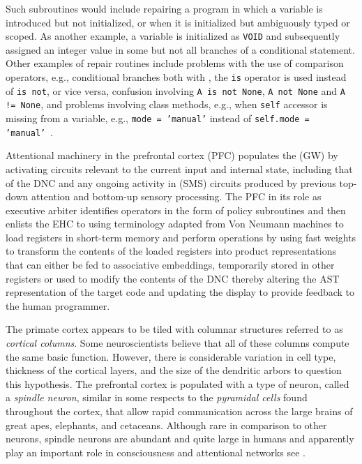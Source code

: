 Such subroutines would include repairing a program in which a variable is introduced but not initialized, or when it is initialized but ambiguously typed or scoped. As another example, a variable is initialized as {\tt{VOID}} and subsequently assigned an integer value in some but not all branches of a conditional statement. Other examples of repair routines include problems with the use of comparison operators, e.g., conditional branches both with \hmleq{}, the {\tt{is}} operator is used instead of {\tt{is not}}, or vice versa, confusion involving {\tt{A is not None}}, {\tt{A not None}} and {\tt{A != None}}, and problems involving class methods, e.g., when {\tt{self}} accessor is missing from a variable, e.g., {\tt{mode = 'manual'}} instead of {\tt{self.mode = 'manual'}}~\cite{ShinetalICLR-18b,DevlinetalICLR-18,WangetalCoRR-17}.

Attentional machinery in the prefrontal cortex (PFC) populates the (GW) by activating circuits relevant to the current input and internal state, including that of the DNC and any ongoing activity in (SMS) circuits produced by previous top-down attention and bottom-up sensory processing. The PFC in its role as executive arbiter identifies operators in the form of policy subroutines and then enlists the EHC to \emdash{} using terminology adapted from Von Neumann machines \emdash{} to load registers in short-term memory and perform operations by using fast weights to transform the contents of the loaded registers into product representations that can either be fed to associative embeddings, temporarily stored in other registers or used to modify the contents of the DNC thereby altering the AST representation of the target code and updating the display to provide feedback to the human programmer.


The primate cortex appears to be tiled with columnar structures referred to as {\it{cortical columns}}. Some neuroscientists believe that all of these columns compute the same basic function. However, there is considerable variation in cell type, thickness of the cortical layers, and the size of the dendritic arbors to question this hypothesis. The prefrontal cortex is populated with a type of neuron, called a {\it{spindle neuron}}, similar in some respects to the {\it{pyramidal cells}} found throughout the cortex, that allow rapid communication across the large brains of great apes, elephants, and cetaceans. Although rare in comparison to other neurons, spindle neurons are abundant and quite large in humans and apparently play an important role in consciousness and attentional networks \emdash{} see {{}}.

